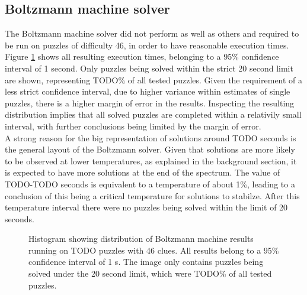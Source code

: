 \documentclass[a4paper,11pt]{kth-mag}
\begin{document}
\subsection{Boltzmann machine solver}
The Boltzmann machine solver did not perform as well as others and required to be run on puzzles of difficulty 46, in order to have reasonable execution times.
Figure \ref{fig:boltzmannDistribution} shows all resulting execution times, belonging to a 95\% confidence interval of 1 second.
Only puzzles being solved within the strict 20 second limit are shown, representing TODO\% of all tested puzzles.
Given the requirement of a less strict confidence interval, due to higher variance within estimates of single puzzles, there is a higher margin of error in the results.
Inspecting the resulting distribution implies that all solved puzzles are completed within a relativily small interval, with further conclusions being limited by the margin of error. \\

A strong reason for the big representation of solutions around TODO seconds is the general layout of the Boltzmann solver.
Given that solutions are more likely to be observed at lower temperatures, as explained in the background section, it is expected to have more solutions at the end of the spectrum.
The value of TODO-TODO seconds is equivalent to a temperature of about 1\%, leading to a conclusion of this being a critical temperature for solutions to stabilze.
After this temperature interval there were no puzzles being solved within the limit of 20 seconds.

\begin{figure}[here] 
\noindent{}
\vspace{-15pt}
\caption{Histogram showing distribution of Boltzmann machine results running on TODO puzzles with 46 clues. All results belong to a 95\% confidence interval of 1 s. The image only contains puzzles being solved under the 20 second limit, which were TODO\% of all tested puzzles.}
\label{fig:boltzmannDistribution}
\end{figure}
\end{document}
